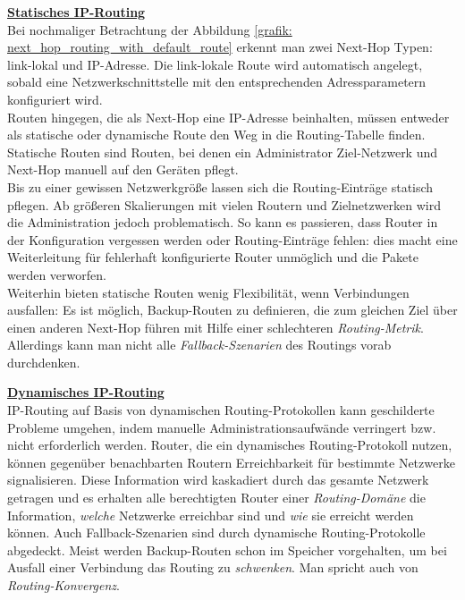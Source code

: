 \textbf{\underline{Statisches IP-Routing}}\\
Bei nochmaliger Betrachtung der Abbildung \ref{grafik: next_hop_routing_with_default_route} erkennt man zwei Next-Hop Typen: link-lokal und \glqq IP-Adresse\grqq{}. Die link-lokale Route wird automatisch angelegt, sobald eine Netzwerkschnittstelle mit den entsprechenden Adressparametern konfiguriert wird.\\
Routen hingegen, die als Next-Hop eine IP-Adresse beinhalten, müssen entweder als statische oder dynamische Route den Weg in die Routing-Tabelle finden. Statische Routen sind Routen, bei denen ein Administrator Ziel-Netzwerk und Next-Hop manuell auf den Geräten pflegt.\\
Bis zu einer gewissen Netzwerkgröße lassen sich die Routing-Einträge statisch pflegen. Ab größeren Skalierungen mit vielen Routern und Zielnetzwerken wird die Administration jedoch problematisch. So kann es passieren, dass Router in der Konfiguration vergessen werden oder Routing-Einträge fehlen: dies macht eine Weiterleitung für fehlerhaft konfigurierte Router unmöglich und die Pakete werden verworfen.\\
Weiterhin bieten statische Routen wenig Flexibilität, wenn Verbindungen ausfallen: Es ist möglich, Backup-Routen zu definieren, die zum gleichen Ziel über einen anderen Next-Hop führen mit Hilfe einer schlechteren \textit{Routing-Metrik}. Allerdings kann man nicht alle \textit{\gls{Fallback}-Szenarien} des Routings vorab durchdenken.

\textbf{\underline{Dynamisches IP-Routing}}\\
IP-Routing auf Basis von dynamischen Routing-Protokollen kann geschilderte Probleme umgehen, indem manuelle Administrationsaufwände verringert bzw. nicht erforderlich werden. Router, die ein dynamisches Routing-Protokoll nutzen, können gegenüber benachbarten Routern Erreichbarkeit für bestimmte Netzwerke signalisieren. Diese Information wird kaskadiert durch das gesamte Netzwerk getragen und es erhalten alle berechtigten Router einer \textit{Routing-Domäne} die Information, \textit{welche} Netzwerke erreichbar sind und \textit{wie} sie erreicht werden können. Auch \gls{Fallback}-Szenarien sind durch dynamische Routing-Protokolle abgedeckt. Meist werden Backup-Routen schon im Speicher vorgehalten, um bei Ausfall einer Verbindung das Routing zu \textit{schwenken}. Man spricht auch von \textit{Routing-Konvergenz}.

